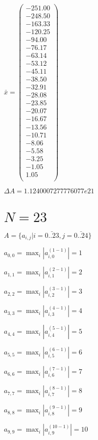 \documentclass[a4paper,12pt]{article}
\begin{document}
$\bar { x } = \begin{pmatrix}
-251.00 \\
-248.50 \\
-163.33 \\
-120.25 \\
-94.00 \\
-76.17 \\
-63.14 \\
-53.12 \\
-45.11 \\
-38.50 \\
-32.91 \\
-28.08 \\
-23.85 \\
-20.07 \\
-16.67 \\
-13.56 \\
-10.71 \\
-8.06 \\
-5.58 \\
-3.25 \\
-1.05 \\
1.05 \\
\end{pmatrix}
$

$\Delta A = 1.1240007277776077e21$



\section{ $N = 23$ }
$A = \{ a _{ i, j } | i = \bar { 0..23 }, j = \bar { 0..24 } \}$

$a _{ 0, 0 } =  \max _i |a _{ i, 0 } ^{ (1 - 1) } | = 1$

$a _{ 1, 1 } =  \max _i |a _{ i, 1 } ^{ (2 - 1) } | = 2$

$a _{ 2, 2 } =  \max _i |a _{ i, 2 } ^{ (3 - 1) } | = 3$

$a _{ 3, 3 } =  \max _i |a _{ i, 3 } ^{ (4 - 1) } | = 4$

$a _{ 4, 4 } =  \max _i |a _{ i, 4 } ^{ (5 - 1) } | = 5$

$a _{ 5, 5 } =  \max _i |a _{ i, 5 } ^{ (6 - 1) } | = 6$

$a _{ 6, 6 } =  \max _i |a _{ i, 6 } ^{ (7 - 1) } | = 7$

$a _{ 7, 7 } =  \max _i |a _{ i, 7 } ^{ (8 - 1) } | = 8$

$a _{ 8, 8 } =  \max _i |a _{ i, 8 } ^{ (9 - 1) } | = 9$

$a _{ 9, 9 } =  \max _i |a _{ i, 9 } ^{ (10 - 1) } | = 10$
\end{document}
